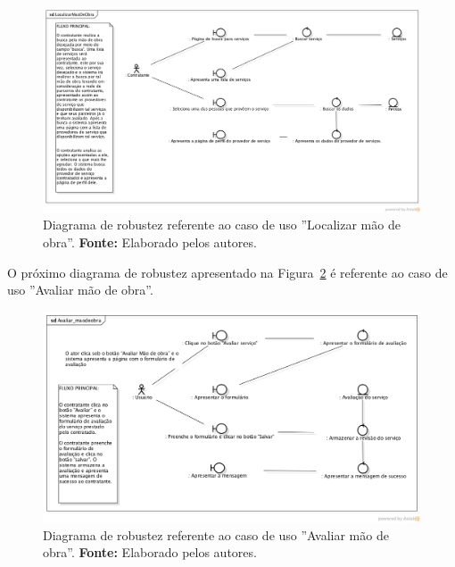 \captionsetup[figure]{list=no}
\begin{figure}[h!]
	\centerline{\includegraphics[scale=0.4]{./imagens/apendices/diagrama-robustez-localizar-mao-de-obra.png}}
	\caption[Diagrama de robustez referente ao caso de uso ''Localizar mão de obra''.]
	{Diagrama de robustez referente ao caso de uso ''Localizar mão de obra''. \textbf{Fonte:} Elaborado pelos autores.}
	\label{fig:ap1:diagrama_robustez_localizar_mao_de_obra}
\end{figure}

O próximo diagrama de robustez apresentado na Figura~\ref{fig:ap1:diagrama_robustez_avaliar_mao_de_obra} é referente ao caso de uso ''Avaliar mão de obra''.

\newpage
\captionsetup[figure]{list=no}
\begin{figure}[h!]
	\centerline{\includegraphics[scale=0.43]{./imagens/apendices/diagrama-robustez-avaliar-mao-de-obra.png}}
	\caption[Diagrama de robustez referente ao caso de uso ''Avaliar mão de obra''.]
	{Diagrama de robustez referente ao caso de uso ''Avaliar mão de obra''. \textbf{Fonte:} Elaborado pelos autores.}
	\label{fig:ap1:diagrama_robustez_avaliar_mao_de_obra}
\end{figure}

